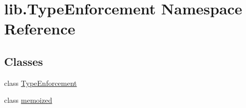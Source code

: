 \hypertarget{namespacelib_1_1_type_enforcement}{\section{lib.\-Type\-Enforcement Namespace Reference}
\label{namespacelib_1_1_type_enforcement}
}
\subsection*{Classes}
\begin{DoxyCompactItemize}
\item 
class \hyperlink{classlib_1_1_type_enforcement_1_1_type_enforcement}{Type\-Enforcement}
\item 
class \hyperlink{classlib_1_1_type_enforcement_1_1memoized}{memoized}
\end{DoxyCompactItemize}
